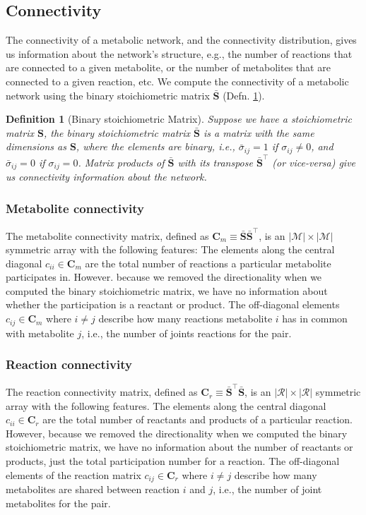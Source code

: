 \documentclass{article}[11pt]
\newtheorem{defn}{Definition}
\begin{document}
\subsection{Connectivity}
The connectivity of a metabolic network, and the connectivity distribution, gives us information about the network's structure, e.g., 
the number of reactions that are connected to a given metabolite, or the number of metabolites that are connected to a given reaction, etc.
We compute the connectivity of a metabolic network using the binary stoichiometric matrix $\bar{\mathbf{S}}$ (Defn. \ref{defn-binary-stoichiometric-matrix}).

\begin{defn}[Binary stoichiometric Matrix]\label{defn-binary-stoichiometric-matrix}
Suppose we have a stoichiometric matrix $\mathbf{S}$, the binary stoichiometric matrix $\bar{\mathbf{S}}$ is a matrix with the same dimensions as $\mathbf{S}$, 
where the elements are binary, i.e., $\bar{\sigma}_{ij} = 1$ if $\sigma_{ij}\neq 0$, and $\bar{\sigma}_{ij} = 0$ if $\sigma_{ij} = 0$.
Matrix products of $\bar{\mathbf{S}}$ with its transpose $\bar{\mathbf{S}}^{\top}$ (or vice-versa) give us connectivity information about the network.
\end{defn}

\subsubsection*{Metabolite connectivity} The metabolite connectivity matrix, defined as $\mathbf{C}_{m} \equiv \bar{\mathbf{S}}\bar{\mathbf{S}}^{\top}$, is an $|\mathcal{M}|\times|\mathcal{M}|$ symmetric array with the following features:
The elements along the central diagonal $c_{ii}\in\mathbf{C}_{m}$ are the total number of reactions a particular metabolite participates in. 
However. because we removed the directionality when we computed the binary stoichiometric matrix, we have no information about whether the participation is a reactant or product.
The off-diagonal elements $c_{ij}\in\mathbf{C}_{m}$ where $i\neq{j}$ describe how many reactions metabolite $i$ has in common with metabolite $j$, i.e., the number of joints reactions for the pair.

\subsubsection*{Reaction connectivity} The reaction connectivity matrix, defined as $\mathbf{C}_{r} \equiv \bar{\mathbf{S}}^{\top}\bar{\mathbf{S}}$, is an $|\mathcal{R}|\times|\mathcal{R}|$ symmetric array with the following features.
The elements along the central diagonal $c_{ii}\in\mathbf{C}_{r}$ are the total number of reactants and products of a particular reaction. 
However, because we removed the directionality when we computed the binary stoichiometric matrix, we have no information about the number of reactants or products, just the total participation number for a reaction.
The off-diagonal elements of the reaction matrix $c_{ij}\in\mathbf{C}_{r}$ where $i\neq{j}$ describe how many metabolites are shared between reaction $i$ and $j$, i.e., the number of joint metabolites for the pair.
\end{document}
